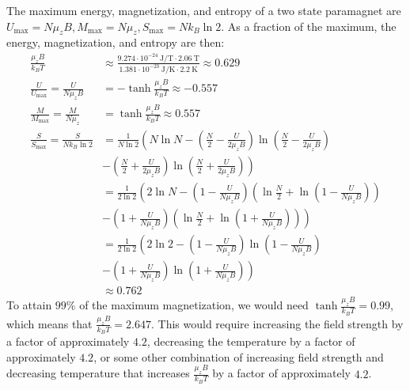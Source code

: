\documentclass{article}
\begin{document}
The maximum energy, magnetization, and entropy of a two state paramagnet are $U_{\text{max}} = N\mu_z B, M_{\text{max}} = N\mu_z, S_{\text{max}} = Nk_B\ln 2$. As a fraction of the maximum, the energy, magnetization, and entropy are then:
\begin{equation}
    \begin{split}
        \frac{\mu_z B}{k_B T} & \approx \frac{9.274 \cdot 10^{-24}~\unit{\joule\per\tesla} \cdot 2.06~\unit{\tesla}}{1.381 \cdot 10^{-23}~\unit{\joule\per\kelvin} \cdot 2.2~\unit{\kelvin}} \approx 0.629 \\
        \frac{U}{U_{\text{max}}} = \frac{U}{N\mu_z B} & = -\tanh\frac{\mu_z B}{k_B T} \approx -0.557 \\
        \frac{M}{M_{\text{max}}} = \frac{M}{N\mu_z} & = \tanh\frac{\mu_z B}{k_B T} \approx 0.557 \\
        \frac{S}{S_{\text{max}}} = \frac{S}{Nk_B\ln 2} & = \frac{1}{N\ln 2}\left(N\ln N - \left(\frac{N}{2} - \frac{U}{2\mu_z B}\right)\ln \left(\frac{N}{2} - \frac{U}{2\mu_z B}\right)\right. \\
        & \left.- \left(\frac{N}{2} + \frac{U}{2\mu_z B}\right)\ln \left(\frac{N}{2} + \frac{U}{2\mu_z B}\right)\right) \\
        & = \frac{1}{2\ln 2}\left(2\ln N - \left(1 - \frac{U}{N\mu_z B}\right)\left(\ln\frac{N}{2} + \ln \left(1 - \frac{U}{N\mu_z B}\right)\right)\right. \\
        & \left.- \left(1 + \frac{U}{N\mu_z B}\right)\left(\ln\frac{N}{2} + \ln \left(1 + \frac{U}{N\mu_z B}\right)\right)\right) \\
        & = \frac{1}{2\ln 2}\left(2\ln 2 - \left(1 - \frac{U}{N\mu_z B}\right)\ln \left(1 - \frac{U}{N\mu_z B}\right)\right. \\
        & \left.- \left(1 + \frac{U}{N\mu_z B}\right)\ln \left(1 + \frac{U}{N\mu_z B}\right)\right) \\
        & \approx 0.762
    \end{split}
\end{equation}
To attain $99\%$ of the maximum magnetization, we would need $\tanh\frac{\mu_z B}{k_B T} = 0.99$, which means that $\frac{\mu_z B}{k_B T} = 2.647$. This would require increasing the field strength by a factor of approximately $4.2$, decreasing the temperature by a factor of approximately $4.2$, or some other combination of increasing field strength and decreasing temperature that increases $\frac{\mu_z B}{k_B T}$ by a factor of approximately $4.2$.
\end{document}
